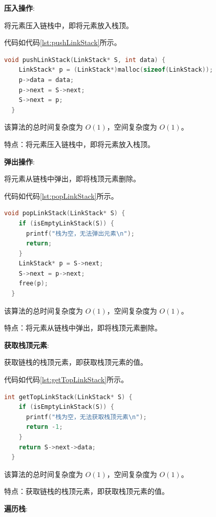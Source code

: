 \documentclass[lang=cn,newtx,10pt,scheme=chinese]{elegantbook}
\begin{document}
\textbf{压入操作}:

将元素压入链栈中，即将元素放入栈顶。

代码如代码\ref{lst:pushLinkStack}所示。

\begin{lstlisting}[language=C++, caption={压入链栈示例代码}, label={lst:pushLinkStack}]
  void pushLinkStack(LinkStack* S, int data) {
    LinkStack* p = (LinkStack*)malloc(sizeof(LinkStack));
    p->data = data;
    p->next = S->next;
    S->next = p;
  }

\end{lstlisting}

该算法的总时间复杂度为 $O(1)$，空间复杂度为 $O(1)$。

特点：将元素压入链栈中，即将元素放入栈顶。

\textbf{弹出操作}:

将元素从链栈中弹出，即将栈顶元素删除。

代码如代码\ref{lst:popLinkStack}所示。

\begin{lstlisting}[language=C++, caption={弹出链栈示例代码}, label={lst:popLinkStack}]
  void popLinkStack(LinkStack* S) {
    if (isEmptyLinkStack(S)) {
      printf("栈为空，无法弹出元素\n");
      return;
    }
    LinkStack* p = S->next;
    S->next = p->next;
    free(p);
  }

\end{lstlisting}

该算法的总时间复杂度为 $O(1)$，空间复杂度为 $O(1)$。

特点：将元素从链栈中弹出，即将栈顶元素删除。

\textbf{获取栈顶元素}:

获取链栈的栈顶元素，即获取栈顶元素的值。

代码如代码\ref{lst:getTopLinkStack}所示。

\begin{lstlisting}[language=C++, caption={获取链栈的栈顶元素示例代码}, label={lst:getTopLinkStack}]
  int getTopLinkStack(LinkStack* S) {
    if (isEmptyLinkStack(S)) {
      printf("栈为空，无法获取栈顶元素\n");
      return -1;
    }
    return S->next->data;
  }

\end{lstlisting}

该算法的总时间复杂度为 $O(1)$，空间复杂度为 $O(1)$。

特点：获取链栈的栈顶元素，即获取栈顶元素的值。

\textbf{遍历栈}:
\end{document}
